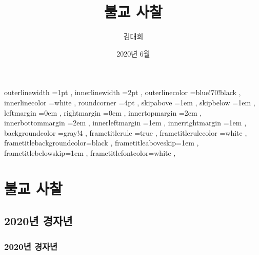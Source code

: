 \documentclass[12pt, a4paper, oneside]{book}
\let\stdsection\section
\renewcommand\section{\newpage\stdsection}
\begin{document}
	
			\dominitoc
			\doparttoc			




			\title{불교 사찰}
			\author{김대희}
			\date{2020년 6월}
			\maketitle


			\tableofcontents 		%
			\cleardoublepage
			\listoftables 			%





		 {
						outerlinewidth		=1pt			,%
						innerlinewidth		=2pt			,%
						outerlinecolor		=blue!70!black	,%
						innerlinecolor		=white 			,%
						roundcorner			=4pt			,%
						skipabove			=1em 			,%
						skipbelow			=1em 			,%
						leftmargin			=0em			,%
						rightmargin			=0em			,%
						innertopmargin		=2em 			,%
						innerbottommargin 	=2em 			,%
						innerleftmargin		=1em 			,%
						innerrightmargin		=1em 			,%
						backgroundcolor		=gray!4			,%
						frametitlerule		=true 			,%
						frametitlerulecolor	=white			,%
						frametitlebackgroundcolor=black		,%
						frametitleaboveskip=1em 			,%
						frametitlebelowskip=1em 			,%
						frametitlefontcolor=white 			,%
						}



	\part{불교 사찰}
	\noptcrule
	\parttoc				

	\chapter{2020년 경자년}


	\section{2020년 경자년}
\end{document}
